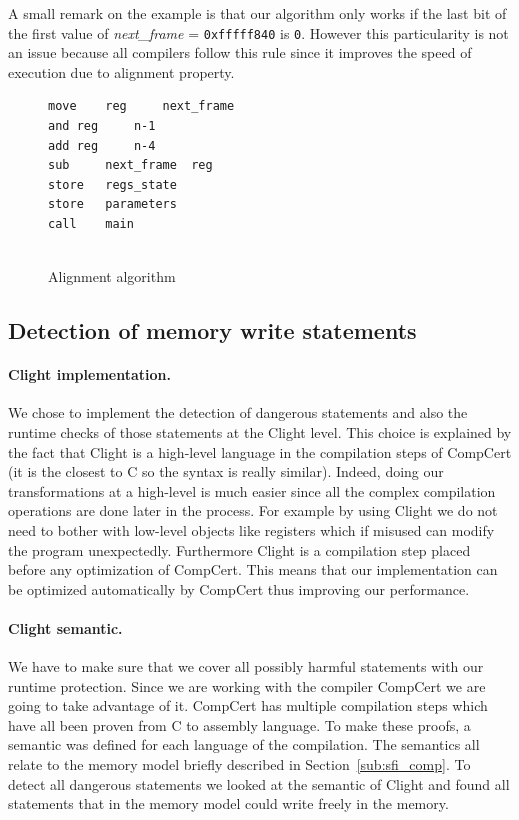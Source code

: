 \documentclass[11pt]{sdm}
\begin{document}
A small remark on the example is that our algorithm only works if the last bit of the first value of \textit{next\_frame} = \texttt{0xfffff840} is \texttt{0}. However this particularity is not an issue because all compilers follow this rule since it improves the speed of execution due to alignment property.

\begin{figure}[!ht]
\centering
\begin{lstlisting}
move	reg		next_frame  
and	reg		n-1	    
add	reg		n-4    
sub 	next_frame	reg
store 	regs_state
store	parameters
call	main
	
\end{lstlisting}
\caption{Alignment algorithm}
\label{align_algo}
\end{figure}

\subsection{Detection of memory write statements}

\paragraph{Clight implementation.}
\label{par:Clight implementation}

We chose to implement the detection of dangerous statements and also the runtime checks of those statements at the Clight level.
This choice is explained by the fact that Clight is a high-level language in the compilation steps of CompCert (it is the closest to C so the syntax is really similar).
Indeed, doing our transformations at a high-level is much easier since all the complex compilation operations are done later in the process.
For example by using Clight we do not need to bother with low-level objects like registers which if misused can modify the program unexpectedly.
Furthermore Clight is a compilation step placed before any optimization of CompCert.
This means that our implementation can be optimized automatically by CompCert thus improving our performance.

\paragraph{Clight semantic.}
\label{par:Clight semantic}

We have to make sure that we cover all possibly harmful statements with our runtime protection.
Since we are working with the compiler CompCert we are going to take advantage of it.
CompCert has multiple compilation steps which have all been proven from C to assembly language.
To make these proofs, a semantic was defined for each language of the compilation. The semantics all relate to the memory model briefly described in Section~\ref{sub:sfi_comp}.
To detect all dangerous statements we looked at the semantic of Clight and found all statements that in the memory model could write freely in the memory.\\
\end{document}
